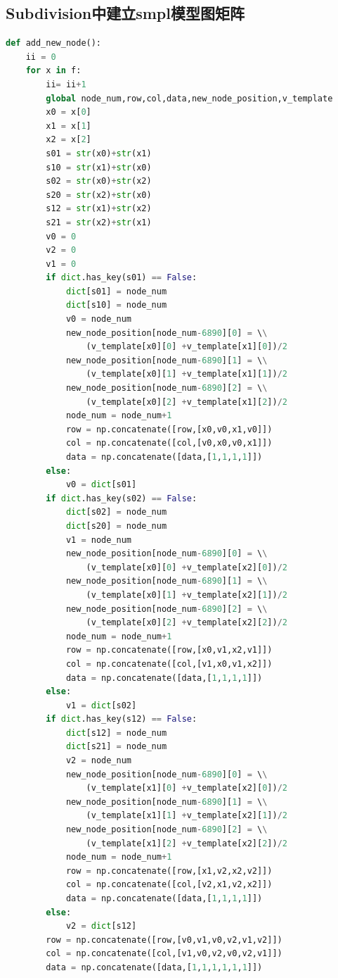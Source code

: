 \documentclass{article}
\begin{document}
\begin{appendices}
\section{Subdivision中建立smpl模型图矩阵}
\begin{lstlisting}[language=python]
def add_new_node():
    ii = 0
    for x in f:
        ii= ii+1
        global node_num,row,col,data,new_node_position,v_template
        x0 = x[0]
        x1 = x[1]
        x2 = x[2]
        s01 = str(x0)+str(x1)
        s10 = str(x1)+str(x0)
        s02 = str(x0)+str(x2)
        s20 = str(x2)+str(x0)
        s12 = str(x1)+str(x2)
        s21 = str(x2)+str(x1)
        v0 = 0
        v2 = 0
        v1 = 0
        if dict.has_key(s01) == False:
            dict[s01] = node_num
            dict[s10] = node_num
            v0 = node_num
            new_node_position[node_num-6890][0] = \\
            	(v_template[x0][0] +v_template[x1][0])/2
            new_node_position[node_num-6890][1] = \\
            	(v_template[x0][1] +v_template[x1][1])/2
            new_node_position[node_num-6890][2] = \\
            	(v_template[x0][2] +v_template[x1][2])/2
            node_num = node_num+1
            row = np.concatenate([row,[x0,v0,x1,v0]])
            col = np.concatenate([col,[v0,x0,v0,x1]])
            data = np.concatenate([data,[1,1,1,1]])
        else:
            v0 = dict[s01]
        if dict.has_key(s02) == False:
            dict[s02] = node_num
            dict[s20] = node_num
            v1 = node_num
            new_node_position[node_num-6890][0] = \\
            	(v_template[x0][0] +v_template[x2][0])/2
            new_node_position[node_num-6890][1] = \\
            	(v_template[x0][1] +v_template[x2][1])/2
            new_node_position[node_num-6890][2] = \\
            	(v_template[x0][2] +v_template[x2][2])/2
            node_num = node_num+1
            row = np.concatenate([row,[x0,v1,x2,v1]])
            col = np.concatenate([col,[v1,x0,v1,x2]])
            data = np.concatenate([data,[1,1,1,1]])
        else:
            v1 = dict[s02]
        if dict.has_key(s12) == False:
            dict[s12] = node_num
            dict[s21] = node_num
            v2 = node_num
            new_node_position[node_num-6890][0] = \\
            	(v_template[x1][0] +v_template[x2][0])/2
            new_node_position[node_num-6890][1] = \\
            	(v_template[x1][1] +v_template[x2][1])/2
            new_node_position[node_num-6890][2] = \\
            	(v_template[x1][2] +v_template[x2][2])/2
            node_num = node_num+1
            row = np.concatenate([row,[x1,v2,x2,v2]])
            col = np.concatenate([col,[v2,x1,v2,x2]])
            data = np.concatenate([data,[1,1,1,1]])
        else:
            v2 = dict[s12]
        row = np.concatenate([row,[v0,v1,v0,v2,v1,v2]])
        col = np.concatenate([col,[v1,v0,v2,v0,v2,v1]])
        data = np.concatenate([data,[1,1,1,1,1,1]])	
        

\end{lstlisting}
\end{appendices}
\end{document}
